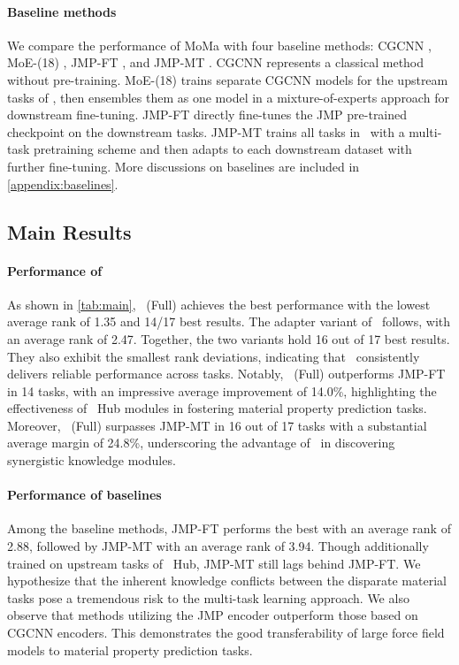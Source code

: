 \paragraph{Baseline methods}
We compare the performance of MoMa with four baseline methods: CGCNN \citep{xie2018crystal}, MoE-(18) \citep{chang2022towards}, JMP-FT \citep{shoghi2023molecules}, and JMP-MT \citep{sanyal2018mt}. CGCNN represents a classical method without pre-training. MoE-(18) trains separate CGCNN models for the upstream tasks of \name, then ensembles them as one model in a mixture-of-experts approach for downstream fine-tuning. JMP-FT directly fine-tunes the JMP pre-trained checkpoint on the downstream tasks. JMP-MT trains all tasks in \name \ with a multi-task pretraining scheme and then adapts to each downstream dataset with further fine-tuning.
More discussions on baselines are included in \cref{appendix:baselines}.


\subsection{Main Results}
\label{exp:main}
\paragraph{Performance of \name}
As shown in \cref{tab:main}, \name \ (Full) achieves the best performance with the lowest average rank of 1.35 and 14/17 best results. The adapter variant of \name \ follows, with an average rank of 2.47. Together, the two variants hold 16 out of 17 best results. They also exhibit the smallest rank deviations, indicating that \name \ consistently delivers reliable performance across tasks. Notably, \name \ (Full) outperforms JMP-FT in 14 tasks, with an impressive average improvement of 14.0\%, highlighting the effectiveness of \name \ Hub modules in fostering material property prediction tasks. 
Moreover, \name \ (Full) surpasses JMP-MT in 16 out of 17 tasks with a substantial average margin of 24.8\%, underscoring the advantage of \name \ in discovering synergistic knowledge modules.

\paragraph{Performance of baselines}
Among the baseline methods, JMP-FT performs the best with an average rank of 2.88, followed by JMP-MT with an average rank of 3.94. Though additionally trained on upstream tasks of \name \ Hub, JMP-MT still lags behind JMP-FT. We hypothesize that the inherent knowledge conflicts between the disparate material tasks pose a tremendous risk to the multi-task learning approach. We also observe that methods utilizing the JMP encoder outperform those based on CGCNN encoders. This demonstrates the good transferability of large force field models to material property prediction tasks.


